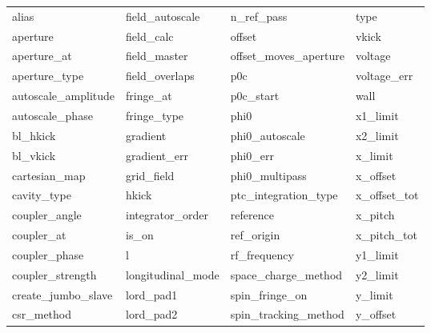  \begin{tabular}{llll} \toprule
alias                       & field_autoscale             & n_ref_pass                  & type                        \\
aperture                    & field_calc                  & offset                      & vkick                       \\
aperture_at                 & field_master                & offset_moves_aperture       & voltage                     \\
aperture_type               & field_overlaps              & p0c                         & voltage_err                 \\
autoscale_amplitude         & fringe_at                   & p0c_start                   & wall                        \\
autoscale_phase             & fringe_type                 & phi0                        & x1_limit                    \\
bl_hkick                    & gradient                    & phi0_autoscale              & x2_limit                    \\
bl_vkick                    & gradient_err                & phi0_err                    & x_limit                     \\
cartesian_map               & grid_field                  & phi0_multipass              & x_offset                    \\
cavity_type                 & hkick                       & ptc_integration_type        & x_offset_tot                \\
coupler_angle               & integrator_order            & reference                   & x_pitch                     \\
coupler_at                  & is_on                       & ref_origin                  & x_pitch_tot                 \\
coupler_phase               & l                           & rf_frequency                & y1_limit                    \\
coupler_strength            & longitudinal_mode           & space_charge_method         & y2_limit                    \\
create_jumbo_slave          & lord_pad1                   & spin_fringe_on              & y_limit                     \\
csr_method                  & lord_pad2                   & spin_tracking_method        & y_offset                    \\

\end{tabular}
